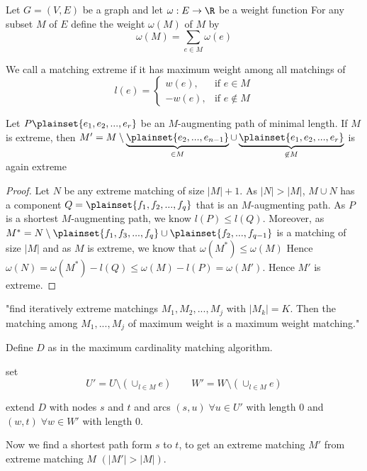 Let $G=(V,E)$ be a graph and let $\omega: E \rightarrow \R$ be a weight function
For any subset $M$ of $E$ define the weight $\omega(M)$ of $M$ by \[
	\omega(M) = \sum\limits_{e \in M}\omega(e)
\]

\begin{defn+}
	We call a matching extreme if it has maximum weight among all matchings of 
	\[
		l(e) =
		\begin{cases}
			w(e), & \text{if } e\in M \\
			-w(e), & \text{if } e \not \in M
		\end{cases}
	\]	
\end{defn+}

\begin{lem}
	Let $P \plainset{e_1, e_2, ..., e_r}$ be an $M$-augmenting path of minimal length.
	If $M$ is extreme, then $M' = M \setminus \underbrace{\plainset{e_2, ..., e_{n-1}}}_{\in M} \cup \underbrace{\plainset{e_1, e_2, ..., e_r}}_{\not \in M}$ is again extreme
\end{lem}

\begin{proof}
	Let $N$ be any extreme matching of size $|M| + 1$. As $|N| > |M|$, $M \cup N$
	has a component $Q = \plainset{f_1, f_2, ..., f_q}$ that is an $M$-augmenting path.
	As $P$ is a shortest $M$-augmenting path, we know $l(P) \leq l(Q)$. Moreover,
	as $M^*=N\setminus \plainset{f_1, f_3, ..., f_q} \cup \plainset{f_2, ..., f_{q-1}}$ 
	is a matching of size $|M|$ and as $M$ is extreme, we know that $\omega(M^*) \leq \omega(M)$
	Hence $\omega(N) = \omega(M^*) - l(Q) \leq \omega (M) - l(P) = \omega(M')$.
	Hence $M'$ is extreme.
\end{proof}

"find iteratively extreme matchings $M_1, M_2, ..., M_j$ with $|M_k|=K$. Then the
matching among $M_1, ..., M_j$ of maximum weight is a maximum weight matching."

Define  $D$ as in the maximum cardinality matching algorithm.

set \[U'=U\setminus (\cup_{l\in M}e) \qquad W'=W\setminus ( \cup_{l \in M}e) \]

extend $D$ with nodes $s$ and $t$ and arcs $(s,u) \; \forall u \in U'$ with 
length $0$ and $(w,t) \; \forall w \in W'$ with length $0$.

Now we find a shortest path form $s$ to $t$, to get an extreme matching $M'$ 
from extreme matching $M$ $(|M'| > |M|)$.

